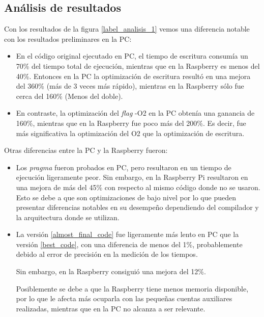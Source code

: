 \documentclass{article}
\begin{document}
\subsection{Análisis de resultados}
Con los resultados de la figura \ref{label_analisis_1} vemos una diferencia notable con los resultados preliminares en la PC:
\begin{itemize}

\item En el código original ejecutado en PC, el tiempo de escritura consumía un 70\% del tiempo total de ejecución, mientras que en la Raspberry es menos del 40\%. Entonces en la PC la optimización de escritura resultó en una mejora del 360\% (más de 3 veces más rápido), mientras en la Raspberry sólo fue cerca del 160\% (Menos del doble).

\item En contraste, la optimización del \emph{flag} -O2 en la PC obtenía una ganancia de 160\%, mientras que en la Raspberry fue poco más del 200\%. Es decir, fue más significativa la optimización del O2 que la optimización de escritura.
\end{itemize}

Otras diferencias entre la PC y la Raspberry fueron:
\begin{itemize}
\item Los \emph{pragma} fueron probados en PC, pero resultaron en un tiempo de ejecución ligeramente peor. Sin embargo, en la Raspberry Pi resultaron en una mejora de más del 45\% con respecto al mismo código donde no se usaron. Esto se debe a que son optimizaciones de bajo nivel por lo que pueden presentar diferencias notables en su desempeño dependiendo del compilador y la arquitectura donde se utilizan.

\item La versión \ref{almost_final_code} fue ligeramente más lento en PC que la versión \ref{best_code}, con una diferencia de menos del 1\%, probablemente debido al error de precisión en la medición de los tiempos.

Sin embargo, en la Raspberry consiguió una mejora del 12\%.

Posiblemente se debe a que la Raspberry tiene menos memoria disponible, por lo que le afecta más ocuparla con las pequeñas cuentas auxiliares realizadas, mientras que en la PC no alcanza a ser relevante.


\end{itemize}
\end{document}

